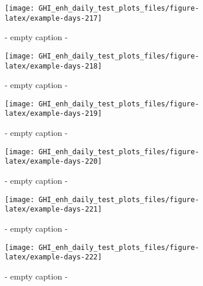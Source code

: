 \documentclass[
  10pt,
  a4paper,oneside]{article}
\begin{document}
\begin{figure}[H]

{\centering \texttt{[image: GHI\_enh\_daily\_test\_plots\_files/figure-latex/example-days-217]} 

}

\caption{ - empty caption - }\label{fig:example-days-217}
\end{figure}

\begin{figure}[H]

{\centering \texttt{[image: GHI\_enh\_daily\_test\_plots\_files/figure-latex/example-days-218]} 

}

\caption{ - empty caption - }\label{fig:example-days-218}
\end{figure}

\begin{figure}[H]

{\centering \texttt{[image: GHI\_enh\_daily\_test\_plots\_files/figure-latex/example-days-219]} 

}

\caption{ - empty caption - }\label{fig:example-days-219}
\end{figure}

\begin{figure}[H]

{\centering \texttt{[image: GHI\_enh\_daily\_test\_plots\_files/figure-latex/example-days-220]} 

}

\caption{ - empty caption - }\label{fig:example-days-220}
\end{figure}

\begin{figure}[H]

{\centering \texttt{[image: GHI\_enh\_daily\_test\_plots\_files/figure-latex/example-days-221]} 

}

\caption{ - empty caption - }\label{fig:example-days-221}
\end{figure}

\begin{figure}[H]

{\centering \texttt{[image: GHI\_enh\_daily\_test\_plots\_files/figure-latex/example-days-222]} 

}

\caption{ - empty caption - }\label{fig:example-days-222}
\end{figure}
\end{document}
